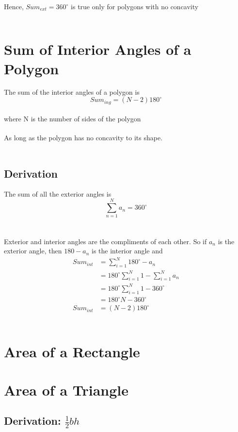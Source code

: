 Hence, \(Sum_{ext} = 360^{\circ}\) is true only for polygons with no concavity \\
\\

\section{Sum of Interior Angles of a Polygon}
The sum of the interior angles of a polygon is
\[Sum_{ing} = (N-2)180^{\circ}\] \\
where N is the number of sides of the polygon\\
\\
As long as the polygon has no concavity to its shape.\\
\\
\subsection{Derivation}

The sum of all the exterior angles is 
\[\sum\limits_{n=1}^{N}{a_n} = 360^{\circ}\] \\
\\
Exterior and interior angles are the compliments of each other.  So if \(a_n\) is the exterior angle, then \(180-a_n\) is the interior angle and \\

\begin{align*}
Sum_{int} &= \sum\limits_{i=1}^N{180^{\circ}-a_n}\\
&= 180^{\circ}\sum\limits_{i=1}^N{1}-\sum\limits_{i=1}^N{a_n}\\
&= 180^{\circ}\sum\limits_{i=1}^N{1}-360^{\circ}\\
&= 180^{\circ}N-360^{\circ}\\
Sum_{int} &= (N-2)180^{\circ}
\end{align*}
\\

\section{Area of a Rectangle}

\section{Area of a Triangle}

\subsection{Derivation: $\frac{1}{2}bh$}

